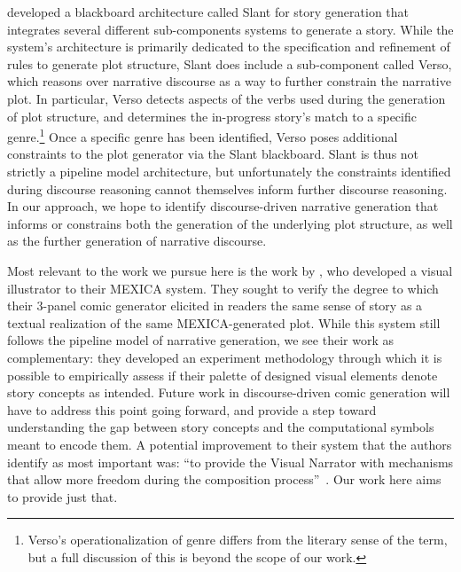  developed a blackboard architecture called Slant for
story generation that integrates several different sub-components systems to
generate a story. While the system's architecture is primarily dedicated to the
specification and refinement of rules to generate plot structure, Slant does
include a sub-component called Verso, which reasons over narrative discourse as
a way to further constrain the narrative plot. In particular, Verso detects
aspects of the verbs used during the generation of plot structure, and
determines the in-progress story's match to a specific genre.\footnote{Verso's
operationalization of genre differs from the literary sense of the term, but a
full discussion of this is beyond the scope of our work.} Once a specific genre
has been identified, Verso poses additional constraints to the plot generator
via the Slant blackboard. Slant is thus not strictly a pipeline model
architecture, but unfortunately the constraints identified during discourse
reasoning cannot themselves inform further discourse reasoning. In our approach,
we hope to identify discourse-driven narrative generation that informs or
constrains both the generation of the underlying plot structure, as well as the
further generation of narrative discourse.

Most relevant to the work we pursue here is the work by
, who developed a visual illustrator to their
MEXICA system. They sought to verify the degree to which their 3-panel comic 
generator elicited in readers the same sense of story as a textual realization 
of the same MEXICA-generated plot. While this system still follows the pipeline
model of narrative generation, we see their work as complementary: they developed 
an experiment methodology through which it is possible to empirically assess if
their palette of designed visual elements denote story concepts as intended. 
Future work in discourse-driven comic generation will have to address this
point going forward, and \citeauthor{perezyperez2012illustrating} provide a step
toward understanding the gap between story concepts and the computational symbols
meant to encode them. A potential improvement to their system that the authors 
identify as most important was: ``to provide the Visual Narrator with mechanisms
that allow more freedom during the composition 
process''~\cite{perezyperez2012illustrating}. Our work here aims to provide just 
that.
